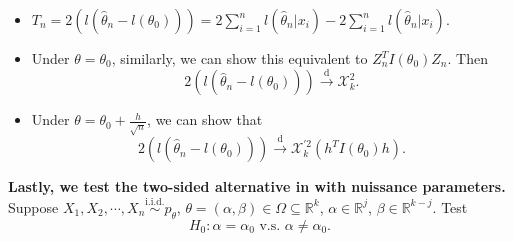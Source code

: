 \documentclass[a4paper]{article}
\begin{document}
\begin{answer}
\begin{itemize}[leftmargin=*]
		\begin{itemize}
			\item $T_n = 2 (l(\hat{\theta}_n - l(\theta_0))) = 2 \sum\limits_{i=1}^n l(\hat{\theta}_n | x_i) - 2 \sum\limits_{i=1}^n l(\hat{\theta}_n | x_i)$.
			\item Under $\theta = \theta_0$, similarly, we can show this equivalent to $Z_n^T I(\theta_0) Z_n$. Then
			\begin{equation*}
				2 (l(\hat{\theta}_n - l(\theta_0))) \stackrel{\text{d}}{\longrightarrow} \mathcal{X}_k^2.
			\end{equation*}
			\item Under $\theta = \theta_0 + \frac{h}{\sqrt{n}}$, we can show that
			\begin{equation*}
				2 (l(\hat{\theta}_n - l(\theta_0))) \stackrel{\text{d}}{\longrightarrow} \mathcal{X}_k^{'2} \left(h^T I(\theta_0) h\right).
			\end{equation*}
		\end{itemize}
	\end{itemize}
\end{answer}

\noindent \textbf{Lastly, we test the two-sided alternative in with nuissance parameters.}\\

\noindent Suppose $X_1,X_2,\cdots,X_n \stackrel{\text{i.i.d.}}{\sim} p_{\theta}$, $\theta = (\alpha, \beta) \in \Omega \subseteq \mathbb{R}^k$, $\alpha \in \mathbb{R}^j$, $\beta \in \mathbb{R}^{k-j}$. Test
\begin{equation*}
	H_0: \alpha = \alpha_0 \text{ v.s. } \alpha \neq \alpha_0.
\end{equation*}
\end{document}
